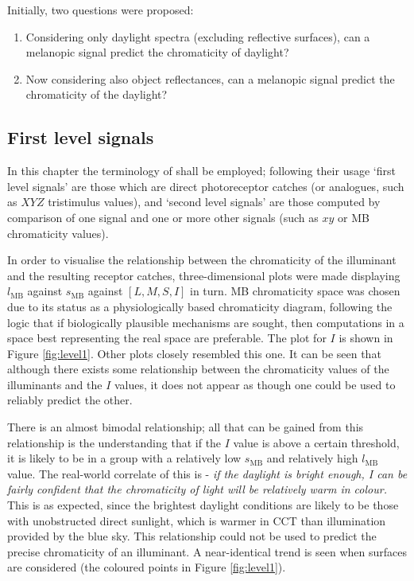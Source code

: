 \bigskip
\noindent
Initially, two questions were proposed:
\begin{enumerate}
\item Considering only daylight spectra (excluding reflective surfaces), can a melanopic signal predict the chromaticity of daylight? \item Now considering also object reflectances, can a melanopic signal predict the chromaticity of the daylight? 
\end{enumerate}

\subsection{First level signals}

In this chapter the terminology of \citet{barrionuevo_contributions_2014} shall be employed; following their usage `first level signals' are those which are direct photoreceptor catches (or analogues, such as $XYZ$ tristimulus values), and `second level signals' are those computed by comparison of one signal and one or more other signals (such as $xy$ or \gls{MB} chromaticity values).

In order to visualise the relationship between the chromaticity of the illuminant and the resulting receptor catches, three-dimensional plots were made displaying $l_{\text{MB}}$ against $s_{\text{MB}}$ against $[L,M,S,I]$ in turn. \gls{MB} chromaticity space was chosen due to its status as a physiologically based chromaticity diagram, following the logic that if biologically plausible mechanisms are sought, then computations in a space best representing the real space are preferable. The plot for $I$ is shown in Figure \ref{fig:level1}. Other plots closely resembled this one. It can be seen that although there exists some relationship between the chromaticity values of the illuminants and the $I$ values, it does not appear as though one could be used to reliably predict the other. 

There is an almost bimodal relationship; all that can be gained from this relationship is the understanding that if the $I$ value is above a certain threshold, it is likely to be in a group with a relatively low $s_{\text{MB}}$ and relatively high $l_{\text{MB}}$ value. The real-world correlate of this is - \textit{if the daylight is bright enough, I can be fairly confident that the chromaticity of light will be relatively warm in colour.} This is as expected, since the brightest daylight conditions are likely to be those with unobstructed direct sunlight, which is warmer in \gls{CCT} than illumination provided by the blue sky. This relationship could not be used to predict the precise chromaticity of an illuminant. A near-identical trend is seen when surfaces are considered (the coloured points in Figure \ref{fig:level1}).

